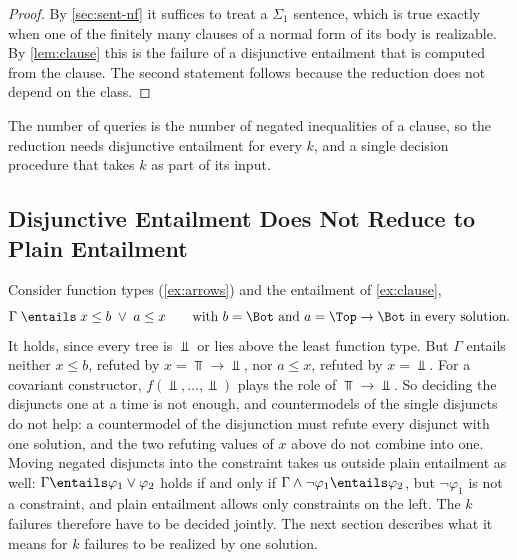 \begin{proof}
By \cref{sec:sent-nf} it suffices to treat a $\Sigma_1$ sentence, which is
true exactly when one of the finitely many clauses of a normal form of its
body is realizable. By \cref{lem:clause} this is the failure of a disjunctive
entailment that is computed from the clause. The second statement follows
because the reduction does not depend on the class.
\end{proof}

The number of queries is the number of negated inequalities of a clause, so
the reduction needs disjunctive entailment for every $k$, and a single
decision procedure that takes $k$ as part of its input.

\subsection{Disjunctive Entailment Does Not Reduce to Plain Entailment}
\label{sec:sent-nonreduction}

Consider function types (\cref{ex:arrows}) and the entailment of
\cref{ex:clause},
\begin{equation}\label{eq:arrow-disj}
  \Gamma\;\entails\;x\le b\;\vee\;a\le x
  \qquad\text{with }b=\Bot\text{ and }a=\Top\to\Bot\text{ in every solution.}
\end{equation}
It holds, since every tree is $\Bot$ or lies above the least function type.
But $\Gamma$ entails neither $x\le b$, refuted by $x=\Top\to\Bot$, nor $a\le
x$, refuted by $x=\Bot$. For a covariant constructor, $f(\Bot,\dots,\Bot)$
plays the role of $\Top\to\Bot$. So deciding the disjuncts one at a time is
not enough, and countermodels of the single disjuncts do not help: a
countermodel of the disjunction must refute every disjunct with one
solution, and the two refuting values of $x$ above do not combine into one.
Moving negated disjuncts into the constraint takes us outside plain
entailment as well: $\Gamma\entails\varphi_1\vee\varphi_2$ holds if and only
if $\Gamma\wedge\neg\varphi_1\entails\varphi_2$, but $\neg\varphi_1$ is not
a constraint, and plain entailment allows only constraints on the left.
The $k$ failures therefore have to be decided jointly. The next section
describes what it means for $k$ failures to be realized by one solution.
